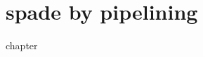 \chapter{\texorpdfstring{\gls{spade}}{SPADe} by pipelining}
\label{chap:pipelined}
\glsresetall
{chapter}